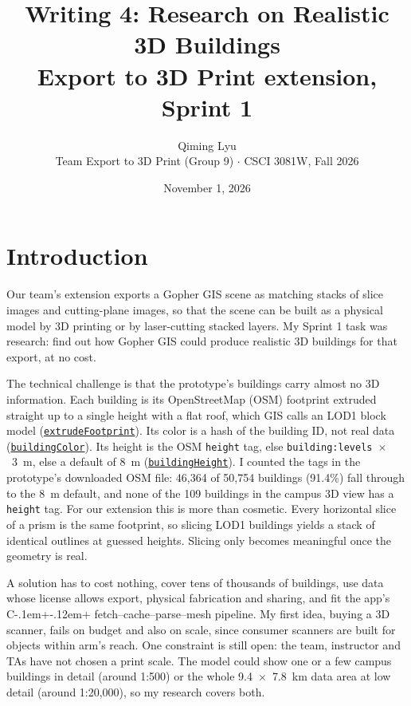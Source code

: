 \documentclass[11pt,letterpaper]{article}
\title{Writing 4: Research on Realistic 3D Buildings\\[0.3em]
  \large Export to 3D Print extension, Sprint 1}
\author{Qiming Lyu\\
  Team Export to 3D Print (Group 9) $\cdot$ CSCI 3081W, Fall 2026}
\date{November 1, 2026}
\newcommand{\cpp}{C\kern-.1em+\kern-.12em+}
\begin{document}
\maketitle

\section*{Introduction}

Our team's extension exports a Gopher GIS scene as matching stacks of slice images and cutting-plane images, so that the scene can be built as a physical model by 3D printing or by laser-cutting stacked layers. My Sprint 1 task was research: find out how Gopher GIS could produce realistic 3D buildings for that export, at no cost.

The technical challenge is that the prototype's buildings carry almost no 3D information. Each building is its OpenStreetMap (OSM) footprint extruded straight up to a single height with a flat roof, which GIS calls an LOD1 block model (\href{https://github.com/csci-3081-20-f26/csci-3081-students-sprint-1-prototype-and-research-group-9/blob/633898d5006ebe1ad46569516fb69f0e32bee508/src/Buildings.cpp#L357}{\texttt{extrudeFootprint}}). Its color is a hash of the building ID, not real data (\href{https://github.com/csci-3081-20-f26/csci-3081-students-sprint-1-prototype-and-research-group-9/blob/633898d5006ebe1ad46569516fb69f0e32bee508/src/Buildings.cpp#L156}{\texttt{buildingColor}}). Its height is the OSM \texttt{height} tag, else \texttt{building:levels}~$\times$~3~m, else a default of 8~m (\href{https://github.com/csci-3081-20-f26/csci-3081-students-sprint-1-prototype-and-research-group-9/blob/633898d5006ebe1ad46569516fb69f0e32bee508/src/Buildings.cpp#L195}{\texttt{buildingHeight}}). I counted the tags in the prototype's downloaded OSM file: 46,364 of 50,754 buildings (91.4\%) fall through to the 8~m default, and none of the 109 buildings in the campus 3D view has a \texttt{height} tag. For our extension this is more than cosmetic. Every horizontal slice of a prism is the same footprint, so slicing LOD1 buildings yields a stack of identical outlines at guessed heights. Slicing only becomes meaningful once the geometry is real.

A solution has to cost nothing, cover tens of thousands of buildings, use data whose license allows export, physical fabrication and sharing, and fit the app's \cpp{} fetch--cache--parse--mesh pipeline. My first idea, buying a 3D scanner, fails on budget and also on scale, since consumer scanners are built for objects within arm's reach. One constraint is still open: the team, instructor and TAs have not chosen a print scale. The model could show one or a few campus buildings in detail (around 1:500) or the whole 9.4~$\times$~7.8~km data area at low detail (around 1:20,000), so my research covers both.
\end{document}
